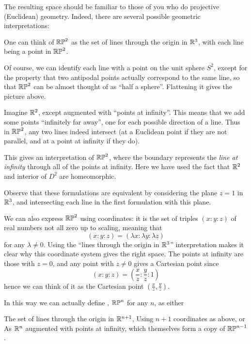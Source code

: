 The resulting space should be familiar to those of you who do
projective (Euclidean) geometry.
Indeed, there are several possible geometric interpretations:
\begin{itemize}
	\ii One can think of $\mathbb{RP}^2$ as the set of lines through the
	origin in $\mathbb R^3$, with each line being a point in $\mathbb{RP}^2$.

	Of course, we can identify each line with a point on the unit sphere $S^2$,
	except for the property that two antipodal points actually
	correspond to the same line, so that $\mathbb{RP}^2$ can be almost thought
	of as ``half a sphere''. Flattening it gives the picture above.

	\ii Imagine $\mathbb R^2$, except augmented with ``points at infinity''.
	This means that we add some points ``infinitely far away'',
	one for each possible direction of a line.
	Thus in $\mathbb{RP}^2$, any two lines indeed intersect
	(at a Euclidean point if they are not parallel, and at a point
	at infinity if they do).

	This gives an interpretation of $\mathbb{RP}^2$,
	where the boundary represents the \emph{line at infinity}
	through all of the points at infinity.
	Here we have used the fact that $\mathbb R^2$
	and interior of $D^2$ are homeomorphic.
\end{itemize}
\begin{exercise}
	Observe that these formulations are equivalent
	by considering the plane $z=1$ in $\mathbb R^3$,
	and intersecting each line in the first formulation with this plane.
\end{exercise}

We can also express $\mathbb{RP}^2$ using coordinates:
it is the set of triples $(x : y : z)$ of real numbers not all zero
up to scaling, meaning that
\[ (x : y : z) = (\lambda x : \lambda y : \lambda z) \]
for any $\lambda \neq 0$.
Using the ``lines through the origin in $\mathbb R^3$'' interpretation
makes it clear why this coordinate system gives the right space.
The points at infinity are those with $z = 0$,
and any point with $z \neq 0$ gives a Cartesian point since
\[ (x : y : z) = \left( \frac xz : \frac yz : 1 \right) \]
hence we can think of it as the Cartesian point $(\frac xz, \frac yz)$.

In this way we can actually define ,
$\mathbb{RP}^n$ for any $n$, as either
\begin{enumerate}[(i)]
	\ii The set of lines through the origin in $\mathbb R^{n+1}$,
	\ii Using $n+1$ coordinates as above, or
	\ii As $\mathbb R^n$ augmented with points at infinity,
	which themselves form a copy of $\mathbb{RP}^{n-1}$.
\end{enumerate}

